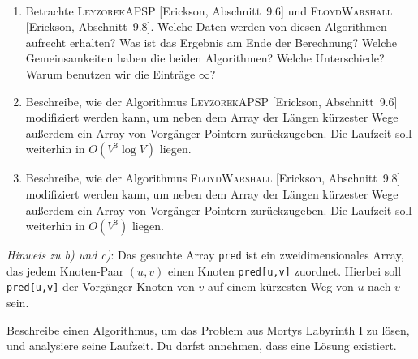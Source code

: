 \documentclass{uebung_cs}
\begin{document}
\begin{exercise}
\ 
  \begin{enumerate}
    \item \athome
    Betrachte \textsc{LeyzorekAPSP} [Erickson, Abschnitt~9.6] und \textsc{FloydWarshall} [Erickson, Abschnitt~9.8].
    Welche Daten werden von diesen Algorithmen aufrecht erhalten?
    Was ist das Ergebnis am Ende der Berechnung?
    Welche Gemeinsamkeiten haben die beiden Algorithmen?
    Welche Unterschiede?
    Warum benutzen wir die Einträge $\infty$?
    \item \atschool Beschreibe, wie der Algorithmus \textsc{LeyzorekAPSP} [Erickson, Abschnitt~9.6] modifiziert werden kann, um neben dem Array der Längen kürzester Wege außerdem ein Array von Vorgänger-Pointern zurückzugeben.
    Die Laufzeit soll weiterhin in $O(V^3 \log V)$ liegen.
    \item \atschool Beschreibe, wie der Algorithmus \textsc{FloydWarshall} [Erickson, Abschnitt~9.8] modifiziert werden kann, um neben dem Array der Längen kürzester Wege außerdem ein Array von Vorgänger-Pointern zurückzugeben.
    Die Laufzeit soll weiterhin in $O(V^3)$ liegen.
  \end{enumerate}
  \emph{Hinweis zu b) und c)}: Das gesuchte Array \texttt{pred} ist ein zweidimensionales Array, das jedem Knoten-Paar $(u,v)$ einen Knoten \texttt{pred[u,v]} zuordnet. Hierbei soll \texttt{pred[u,v]} der Vorgänger-Knoten von $v$ auf einem kürzesten Weg von $u$ nach $v$ sein.
\end{exercise}

\begin{exercise}
  Beschreibe einen Algorithmus, um das Problem aus Mortys Labyrinth I zu lösen, und analysiere seine Laufzeit.
  Du darfst annehmen, dass eine Lösung existiert.
\end{exercise}
\end{document}
